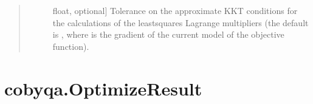 \documentclass[letterpaper,10pt,english]{sphinxmanual}
\begin{document}
\begin{fulllineitems}
\begin{quote}
\begin{description}
\begin{description}
\item[{}] \leavevmode{[}float, optional{]}
\sphinxAtStartPar
Tolerance on the approximate KKT conditions for the calculations of the
least\sphinxhyphen{}squares Lagrange multipliers (the default is
, where  is the
gradient of the current model of the objective function).

\end{description}

\end{description}\end{quote}

\end{fulllineitems}



\section{cobyqa.OptimizeResult}
\label{\detokenize{refs/generated/cobyqa.OptimizeResult:cobyqa-optimizeresult}}\label{\detokenize{refs/generated/cobyqa.OptimizeResult::doc}}
\end{document}
